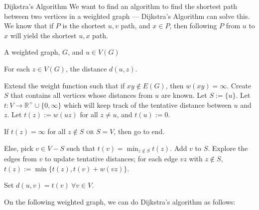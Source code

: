\documentclass[10pt]{extarticle}
\begin{document}
  \begin{problem}{Dijkstra's Algorithm}
    We want to find an algorithm to find the shortest path between two vertices in a weighted graph --- Dijkstra's Algorithm can solve this.\\

    We know that if $P$ is the shortest $u,v$ path, and $x\in P$, then following $P$ from $u$ to $x$ will yield the shortest $u,x$ path.
    \begin{description}[font=\normalfont\scshape]
      \item[Input] A weighted graph, $G$, and $u\in V(G)$
      \item[Output] For each $z\in V(G)$, the distance $d(u,z)$.
      \item[Initialization]Extend the weight function such that if $xy\notin E(G)$, then $w(xy) = \infty$. Create $S$ that contains all vertices whose distances from $u$ are known. Let $S := \{u\}$. Let $t:V\rightarrow \mathbb{R}^+ \cup \{0,\infty\}$ which will keep track of the tentative distance between $u$ and $z$. Let $t(z) := w(uz)$ for all $z\neq u$, and $t(u) := 0$.
      \item[Condition to Terminate Loop] If $t(z) = \infty$ for all $z\notin S$ \textsc{or} $S = V$, then go to end.
      \item[Loop] Else, pick $v\in V-S$ such that $t(v) = \min_{z\notin S} t(z)$. Add $v$ to $S$. Explore the edges from $v$ to update tentative distances; for each edge $vz$ with $z\notin S$, $t(z) := \min\{t(z),t(v) + w(vz)\}$.
      \item[End] Set $d(u,v) = t(v)~\forall v\in V$.
    \end{description}
    On the following weighted graph, we can do Dijkstra's algorithm as follows:
    \begin{center}
    \end{center}
  \end{problem}
\end{document}
